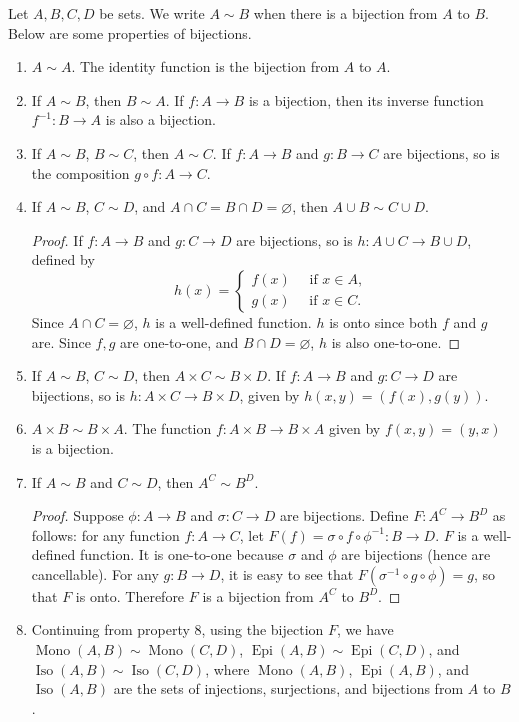\documentclass[12pt]{article}
\begin{document}
Let $A,B,C,D$ be sets.  We write $A\sim B$ when there is a bijection from $A$ to $B$.  Below are some properties of bijections.

\begin{enumerate}
\item $A\sim A$.  The identity function is the bijection from $A$ to $A$.
\item If $A\sim B$, then $B\sim A$.  If $f:A\to B$ is a bijection, then its inverse function $f^{-1}:B\to A$ is also a bijection.
\item If $A\sim B$, $B\sim C$, then $A\sim C$.  If $f:A\to B$ and $g:B\to C$ are bijections, so is the composition $g\circ f:A\to C$.
\item If $A\sim B$, $C\sim D$, and $A\cap C=B\cap D=\varnothing$, then $A\cup B\sim C\cup D$.  
\begin{proof}
If $f:A\to B$ and $g:C\to D$ are bijections, so is $h:A\cup C\to B\cup D$, defined by 
\begin{displaymath}
h(x)= \left\{
\begin{array}{ll}
f(x) \quad \mbox{ if }x\in A,\\
g(x) \quad \mbox{ if }x\in C.
\end{array}
\right.
\end{displaymath}
Since $A\cap C=\varnothing$, $h$ is a well-defined function.  $h$ is onto since both $f$ and $g$ are.  Since $f,g$ are one-to-one, and $B\cap D=\varnothing$, $h$ is also one-to-one.
\end{proof}
\item If $A\sim B$, $C\sim D$, then $A\times C\sim B\times D$.  If $f:A\to B$ and $g:C\to D$ are bijections, so is $h:A\times C\to B\times D$, given by $h(x,y)=(f(x),g(y))$.
\item $A\times B\sim B\times A$.  The function $f:A\times B\to B\times A$ given by $f(x,y)=(y,x)$ is a bijection.
\item If $A\sim B$ and $C\sim D$, then $A^C\sim B^D$.
\begin{proof}  Suppose $\phi:A\to B$ and $\sigma:C\to D$ are bijections.  Define $F:A^C\to B^D$ as follows: for any function $f:A\to C$, let $F(f)= \sigma \circ f \circ \phi^{-1}: B\to D$.  $F$ is a well-defined function.  It is one-to-one because $\sigma$ and $\phi$ are bijections (hence are cancellable).  For any $g:B\to D$, it is easy to see that $F(\sigma^{-1} \circ g \circ \phi)=g$, so that $F$ is onto.  Therefore $F$ is a bijection from $A^C$ to $B^D$.
\end{proof}
\item Continuing from property 8, using the bijection $F$, we have $\operatorname{Mono}(A,B)\sim \operatorname{Mono}(C,D)$, $\operatorname{Epi}(A,B)\sim \operatorname{Epi}(C,D)$, and $\operatorname{Iso}(A,B)\sim \operatorname{Iso}(C,D)$, where $\operatorname{Mono}(A,B)$, $\operatorname{Epi}(A,B)$, and $\operatorname{Iso}(A,B)$ are the sets of injections, surjections, and bijections from $A$ to $B$.

\end{enumerate}
\end{document}
